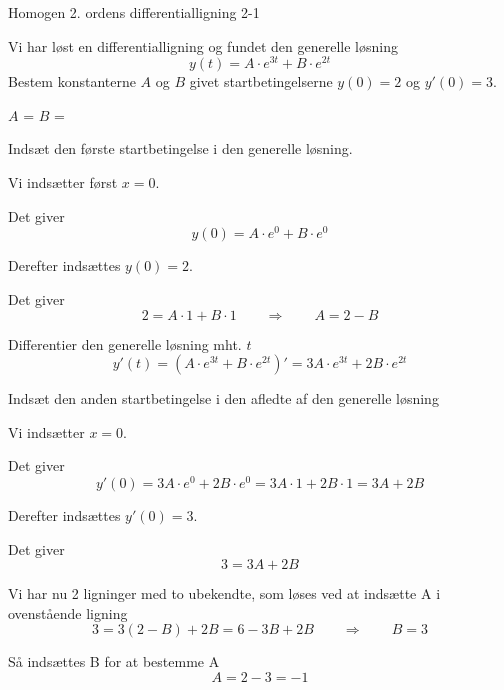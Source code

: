 \documentclass{article}
\begin{document}
\begin{exercise}{Homogen 2. ordens differentialligning 2-1}

Vi har løst en differentialligning og fundet den generelle løsning
\[
y(t) = A \cdot e^{3t} + B \cdot e^{2t}
\]
Bestem konstanterne $A$ og $B$ givet startbetingelserne $y(0)=2$ og $y'(0)=3$.


$A$ = 
$B$ = 

\hint

Indsæt den første startbetingelse i den generelle løsning.


\hint

Vi indsætter først $x=0$.

\hint

Det giver
\[
y(0)= A \cdot e^{0} + B \cdot e^{0}
\]

\hint

Derefter indsættes $y(0)=2$.

\hint

Det giver
\[
2= A \cdot 1 + B \cdot 1 \qquad \Rightarrow \qquad A = 2 - B
\]

\hint

Differentier den generelle løsning mht. $t$
\[
y'(t)= \left(A \cdot e^{3t} + B \cdot e^{2t} \right)' = 3A \cdot e^{3t} + 2B \cdot e^{2t}
\]

\hint

Indsæt den anden startbetingelse i den afledte af den generelle løsning

\hint

Vi indsætter $x=0$.

\hint

Det giver
\[
y'(0) = 3A \cdot e^{0} + 2B \cdot e^{0} = 3A \cdot 1 + 2B \cdot 1 = 3A + 2B
\]

\hint

Derefter indsættes $y'(0)=3$.
\hint

Det giver
\[
3 = 3A+ 2B
\]

\hint

Vi har nu 2 ligninger med to ubekendte, som løses ved at indsætte A i ovenstående ligning
\[
3 = 3(2 - B) + 2B = 6 - 3B + 2B \qquad \Rightarrow \qquad B = 3
\]

\hint

Så indsættes B for at bestemme A
\[
A = 2 - 3 = -1
\]

\end{exercise}

\newpage
\end{document}
